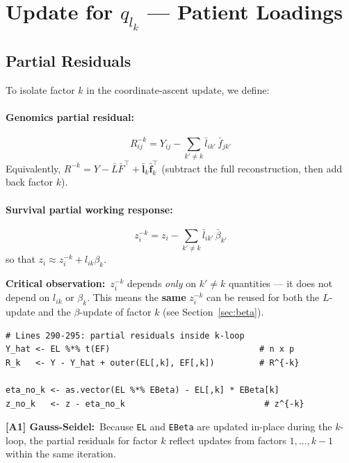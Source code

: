 \documentclass[11pt]{article}
\newcommand{\lbar}[2]{\bar{l}_{#1#2}}
\newcommand{\fbar}[2]{\bar{f}_{#1#2}}
\newcommand{\betabar}[1]{\bar{\beta}_{#1}}
\newcommand{\coderef}[1]{{\color{blue!70!black}\texttt{#1}}}
\begin{document}
\section{Update for \texorpdfstring{$q_{l_k}$}{q(lk)} --- Patient Loadings}
\label{sec:update-L}

\subsection{Partial Residuals}\label{sec:partial-residuals}

To isolate factor $k$ in the coordinate-ascent update, we define:

\paragraph{Genomics partial residual:}
\begin{equation}\label{eq:R-residual}
  R^{-k}_{ij} = Y_{ij} - \sum_{k' \neq k} \lbar{i}{k'}\,\fbar{j}{k'}
\end{equation}
Equivalently, $R^{-k} = Y - \bar{L}\bar{F}^{\top} + \bar{\bm{l}}_k\bar{\bm{f}}_k^{\top}$
(subtract the full reconstruction, then add back factor $k$).

\paragraph{Survival partial working response:}
\begin{equation}\label{eq:z-residual}
  z^{-k}_i = z_i - \sum_{k' \neq k} \lbar{i}{k'}\,\betabar{k'}
\end{equation}
so that $z_i \approx z^{-k}_i + l_{ik}\beta_k$.

\textbf{Critical observation:}\ $z^{-k}_i$ depends \emph{only} on $k'\neq k$
quantities --- it does not depend on $l_{ik}$ or $\beta_k$.  This means the
\textbf{same} $z^{-k}_i$ can be reused for both the $L$-update and the
$\beta$-update of factor $k$ (see Section~\ref{sec:beta}).

\begin{codebox}
\begin{lstlisting}[style=Rstyle]
# Lines 290-295: partial residuals inside k-loop
Y_hat <- EL %*% t(EF)                              # n x p
R_k   <- Y - Y_hat + outer(EL[,k], EF[,k])         # R^{-k}

eta_no_k <- as.vector(EL %*% EBeta) - EL[,k] * EBeta[k]
z_no_k   <- z - eta_no_k                            # z^{-k}
\end{lstlisting}
\textbf{[A1] Gauss-Seidel:}\ Because \coderef{EL} and \coderef{EBeta} are
updated in-place during the $k$-loop, the partial residuals for factor $k$
reflect updates from factors $1,\ldots,k-1$ within the same iteration.
\end{codebox}
\end{document}
